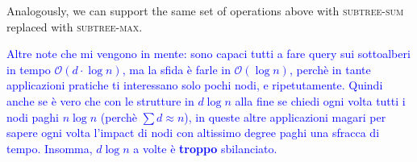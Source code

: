 \documentclass[a4paper,USenglish]{lipics}
\newcommand{\bigoh}{\mathcal{O}}
\begin{document}
			Analogously, we can support the same set of operations above with \textsc{subtree-sum} replaced with \textsc{subtree-max}.
			
			\textcolor{blue}{Altre note che mi vengono in mente: sono capaci tutti a fare query sui sottoalberi in tempo $\bigoh(d\cdot\log n)$, ma la sfida è farle in $\bigoh(\log n)$, perchè in tante applicazioni pratiche ti interessano solo pochi nodi, e ripetutamente. Quindi anche se è vero che con le strutture in $d\log n$ alla fine se chiedi ogni volta tutti i nodi paghi $n \log n$ (perchè $\sum d \approx n$), in queste altre applicazioni magari per sapere ogni volta l'impact di nodi con altissimo degree paghi una sfracca di tempo. Insomma, $d \log n$ a volte è \textbf{troppo} sbilanciato.}

\fi 
\end{document}
